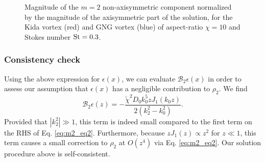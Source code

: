 \documentclass[apj]{emulateapj}
\newcommand{\Eq}[1]{Eq. (\ref{#1})}
\newcommand{\eq}[1]{\Eq{#1}}
\newcommand{\beq}{\begin{equation}}
\newcommand{\eeq}{\end{equation}}
\begin{document}
\begin{figure}
  \begin{center}
  \end{center}
  \caption[]{Magnitude of the $m=2$ non-axisymmetric component normalized by the magnitude of the axisymmetric part of the solution, for the Kida vortex (red) and GNG vortex (blue) of aspect-ratio $\chi=10$ and Stokes number $\rm{St}=0.3$. }
 \label{fig:nonaxi}
\end{figure}



\subsubsection{Consistency check}
Using the above expression for $\epsilon(x)$, we can evaluate
$\mathcal{B}_2\epsilon(x)$ in order to assess our assumption that
$\epsilon(x)$ has a negligible contribution to $\rho_2$. We find
\beq
\mathcal{B}_2\epsilon(z) =
-\frac{\tilde{\chi}^2D_0k_0^5zJ_1(k_0z)}{2\left(k_2^2 -
  k_0^2\right)}. 
\eeq
Provided that $|k_2^2|\gg1$, this term is indeed small compared to the
first term on the RHS of Eq. \ref{eq:m2_eq2}. Furthermore, because
$zJ_1(z)\propto z^2$ for $z\ll1$, this term causes a small correction
to $\rho_2$ at $O(z^4)$ via Eq. \ref{eq:m2_eq2}. Our solution 
procedure above is self-consistent.  

\end{document}
